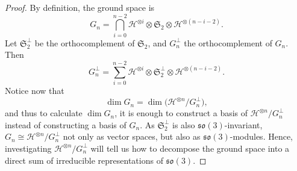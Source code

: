 \documentclass[a4paper]{article}
\newcommand{\so}{\mathfrak{so}}
\theoremstyle{definition}
\begin{document}
\begin{proof}
By definition, the ground space is
\begin{equation*}
    G_n = \bigcap_{i=0}^{n-2} \mathcal{H}^{\otimes i} \otimes \mathfrak{S}_2 \otimes \mathcal{H}^{\otimes (n-i-2)}.
\end{equation*}
Let $\mathfrak{S}_2^\perp$ be the orthocomplement of $\mathfrak{S}_2$, and $G_n^\perp$ the orthocomplement of $G_n$. Then
\begin{equation*}
    G_n^\perp =  \sum_{i=0}^{n-2} \mathcal{H}^{\otimes i} \otimes \mathfrak{S}_2^\perp \otimes \mathcal{H}^{\otimes (n-i-2)} .
\end{equation*}
Notice now that 
\begin{equation*}
    \dim G_n = \dim \bigl( \mathcal{H}^{\otimes n} / G_n^\perp \bigr),
\end{equation*}
and thus to calculate $\dim G_n$, it is enough to construct a basis of $\mathcal{H}^{\otimes n} / G_n^\perp$ instead of constructing a basis of $G_n$.  As $\mathfrak{S}_2^\perp$ is also $\so(3)$-invariant, $G_n \cong \mathcal{H}^{\otimes n} / G_n^\perp$ not only as vector spaces, but also as $\so(3)$-modules. 
Hence, investigating $\mathcal{H}^{\otimes n} / G_n^\perp$ will tell us how to decompose the ground space into a direct sum of irreducible representations of $\so(3)$.


\end{proof}
\end{document}
